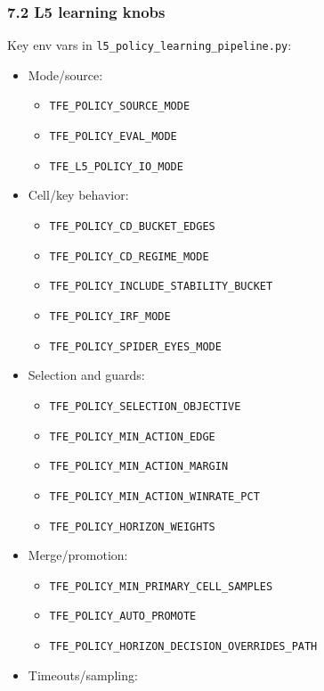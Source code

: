 \documentclass[
]{article}
\providecommand{\tightlist}{%
  \setlength{\itemsep}{0pt}\setlength{\parskip}{0pt}}
\begin{document}
\subsubsection{7.2 L5 learning knobs}\label{72-l5-learning-knobs}

Key env vars in \texttt{l5\_policy\_learning\_pipeline.py}:

\begin{itemize}
\tightlist
\item
  Mode/source:

  \begin{itemize}
  \tightlist
  \item
    \texttt{TFE\_POLICY\_SOURCE\_MODE}
  \item
    \texttt{TFE\_POLICY\_EVAL\_MODE}
  \item
    \texttt{TFE\_L5\_POLICY\_IO\_MODE}
  \end{itemize}
\item
  Cell/key behavior:

  \begin{itemize}
  \tightlist
  \item
    \texttt{TFE\_POLICY\_CD\_BUCKET\_EDGES}
  \item
    \texttt{TFE\_POLICY\_CD\_REGIME\_MODE}
  \item
    \texttt{TFE\_POLICY\_INCLUDE\_STABILITY\_BUCKET}
  \item
    \texttt{TFE\_POLICY\_IRF\_MODE}
  \item
    \texttt{TFE\_POLICY\_SPIDER\_EYES\_MODE}
  \end{itemize}
\item
  Selection and guards:

  \begin{itemize}
  \tightlist
  \item
    \texttt{TFE\_POLICY\_SELECTION\_OBJECTIVE}
  \item
    \texttt{TFE\_POLICY\_MIN\_ACTION\_EDGE}
  \item
    \texttt{TFE\_POLICY\_MIN\_ACTION\_MARGIN}
  \item
    \texttt{TFE\_POLICY\_MIN\_ACTION\_WINRATE\_PCT}
  \item
    \texttt{TFE\_POLICY\_HORIZON\_WEIGHTS}
  \end{itemize}
\item
  Merge/promotion:

  \begin{itemize}
  \tightlist
  \item
    \texttt{TFE\_POLICY\_MIN\_PRIMARY\_CELL\_SAMPLES}
  \item
    \texttt{TFE\_POLICY\_AUTO\_PROMOTE}
  \item
    \texttt{TFE\_POLICY\_HORIZON\_DECISION\_OVERRIDES\_PATH}
  \end{itemize}
\item
  Timeouts/sampling:


\end{itemize}
\end{document}
